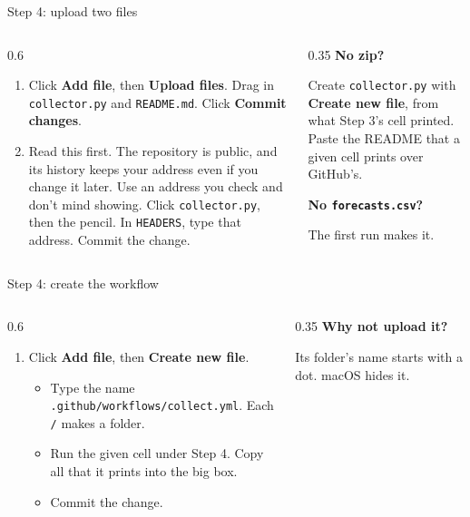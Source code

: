 \documentclass[9pt,aspectratio=169]{beamer}
\begin{document}
\begin{frame}{Step 4: upload two files}
    \begin{columns}[T]
        \begin{column}{0.6\textwidth}
            \begin{enumerate}\small\setcounter{enumi}{2}
                \item Click \textbf{Add file}, then \textbf{Upload files}. Drag in \texttt{collector.py} and \texttt{README.md}. Click \textbf{Commit changes}.
                \item Read this first. The repository is public, and its history keeps your address even if you change it later. Use an address you check and don't mind showing. Click \texttt{collector.py}, then the pencil. In \texttt{HEADERS}, type that address. Commit the change.
            \end{enumerate}
        \end{column}
        \begin{column}{0.35\textwidth}
            \textbf{No zip?}\\[2pt]
            {\footnotesize Create \texttt{collector.py} with \textbf{Create new file}, from what Step 3's cell printed. Paste the README that a given cell prints over GitHub's.\par}
            \medskip
            \textbf{No \texttt{forecasts.csv}?}\\[2pt]
            {\footnotesize The first run makes it.\par}
        \end{column}
    \end{columns}
\end{frame}

\begin{frame}{Step 4: create the workflow}
    \begin{columns}[T]
        \begin{column}{0.6\textwidth}
            \begin{enumerate}\small\setcounter{enumi}{4}
                \item Click \textbf{Add file}, then \textbf{Create new file}.
                \begin{itemize}\small
                    \item Type the name \texttt{.github/workflows/collect.yml}. Each \texttt{/} makes a folder.
                    \item Run the given cell under Step 4. Copy all that it prints into the big box.
                    \item Commit the change.
                \end{itemize}
            \end{enumerate}
        \end{column}
        \begin{column}{0.35\textwidth}
            \textbf{Why not upload it?}\\[2pt]
            {\footnotesize Its folder's name starts with a dot. macOS hides it.\par}
        \end{column}
    \end{columns}
\end{frame}
\end{document}
